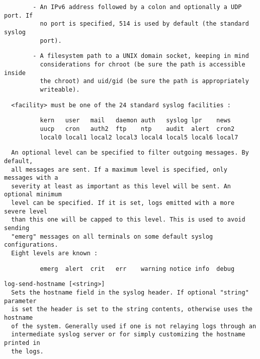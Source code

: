 \begin{verbatim}
        - An IPv6 address followed by a colon and optionally a UDP port. If
          no port is specified, 514 is used by default (the standard syslog
          port).
\end{verbatim}

\begin{verbatim}
        - A filesystem path to a UNIX domain socket, keeping in mind
          considerations for chroot (be sure the path is accessible inside
          the chroot) and uid/gid (be sure the path is appropriately
          writeable).
\end{verbatim}

\begin{verbatim}
  <facility> must be one of the 24 standard syslog facilities :
\end{verbatim}

\begin{verbatim}
          kern   user   mail   daemon auth   syslog lpr    news
          uucp   cron   auth2  ftp    ntp    audit  alert  cron2
          local0 local1 local2 local3 local4 local5 local6 local7
\end{verbatim}

\begin{verbatim}
  An optional level can be specified to filter outgoing messages. By default,
  all messages are sent. If a maximum level is specified, only messages with a
  severity at least as important as this level will be sent. An optional minimum
  level can be specified. If it is set, logs emitted with a more severe level
  than this one will be capped to this level. This is used to avoid sending
  "emerg" messages on all terminals on some default syslog configurations.
  Eight levels are known :
\end{verbatim}

\begin{verbatim}
          emerg  alert  crit   err    warning notice info  debug
\end{verbatim}

\begin{verbatim}
log-send-hostname [<string>]
  Sets the hostname field in the syslog header. If optional "string" parameter
  is set the header is set to the string contents, otherwise uses the hostname
  of the system. Generally used if one is not relaying logs through an
  intermediate syslog server or for simply customizing the hostname printed in
  the logs.
\end{verbatim}

